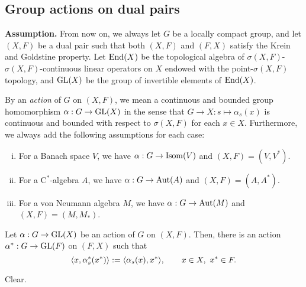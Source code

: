 \documentclass{../../../small}
\begin{document}
\subsection{Group actions on dual pairs}


\textbf{Assumption.}
From now on, we always let $G$ be a locally compact group, and let $(X,F)$ be a dual pair such that both $(X,F)$ and $(F,X)$ satisfy the Krein and Goldstine property.
Let $\operatorname{End}(X)$ be the topological algebra of $\sigma(X,F)$-$\sigma(X,F)$-continuous linear operators on $X$ endowed with the point-$\sigma(X,F)$ topology, and $\mathrm{GL}(X)$ be the group of invertible elements of $\operatorname{End}(X)$.

By an \emph{action} of $G$ on $(X,F)$, we mean a continuous and bounded group homomorphism $\alpha:G\to\mathrm{GL}(X)$ in the sense that $G\to X:s\mapsto\alpha_s(x)$ is continuous and bounded with respect to $\sigma(X,F)$ for each $x\in X$.
Furthermore, we always add the following assumptions for each case:
\begin{enumerate}[(i)]
\item For a Banach space $V$, we have $\alpha:G\to\operatorname{Isom}(V)$ and $(X,F)=(V,V^*)$.
\item For a C$^*$-algebra $A$, we have $\alpha:G\to\operatorname{Aut}(A)$ and $(X,F)=(A,A^*)$.
\item For a von Neumann algebra $M$, we have $\alpha:G\to\operatorname{Aut}(M)$ and $(X,F)=(M,M_*)$.
\end{enumerate}


\begin{prop}
Let $\alpha:G\to\mathrm{GL}(X)$ be an action of $G$ on $(X,F)$.
Then, there is an action $\alpha^*:G\to\mathrm{GL}(F)$ on $(F,X)$ such that
\[\langle x,\alpha^*_s(x^*)\rangle:=\langle\alpha_s(x),x^*\rangle,\qquad x\in X,\ x^*\in F.\]
\end{prop}
\begin{pf}
Clear.
\end{pf}
\end{document}
